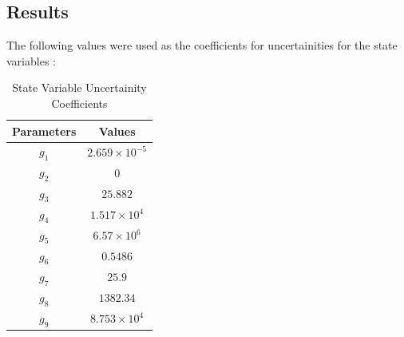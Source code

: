 \subsection{Results}
The following values were used as the coefficients for uncertainities for the state variables :
\begin{center}
\begin{table}[!h]
\centering
\caption{State Variable Uncertainity Coefficients\cite{yenkie}}
\begin{tabular}{|c|c|}
\hline
Parameters & Values \\
\hline
$g_{1}$ & $2.659\times10^{-5}$ \\
$g_{2}$ & $0$ \\
$g_{3}$ & $25.882$ \\
$g_{4}$ & $1.517\times10^{4}$ \\ 
$g_{5}$ & $6.57\times10^{6}$ \\
$g_{6}$ & $0.5486$ \\
$g_{7}$ & $25.9$\\
$g_{8}$ & $1382.34$ \\
$g_{9}$ & $8.753\times10^{4}$ \\
\hline
\end{tabular}

\label{Table2}
\end{table}
\end{center}

